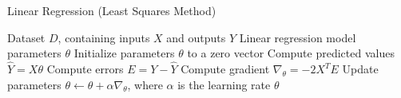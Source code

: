 \documentclass{article}
\begin{document}
	
	\begin{algorithm}
		\caption{Linear Regression (Least Squares Method)}
		\begin{algorithmic}[1]
			\Require Dataset $D$, containing inputs $X$ and outputs $Y$
			\Ensure Linear regression model parameters $\theta$
			\State Initialize parameters $\theta$ to a zero vector
			\Repeat
			\State Compute predicted values $\hat{Y} = X\theta$
			\State Compute errors $E = Y - \hat{Y}$
			\State Compute gradient $\nabla_{\theta} = -2X^TE$
			\State Update parameters $\theta \leftarrow \theta + \alpha \nabla_{\theta}$, where $\alpha$ is the learning rate
			\State \Return $\theta$
		\end{algorithmic}
	\end{algorithm}
	
\end{document}
